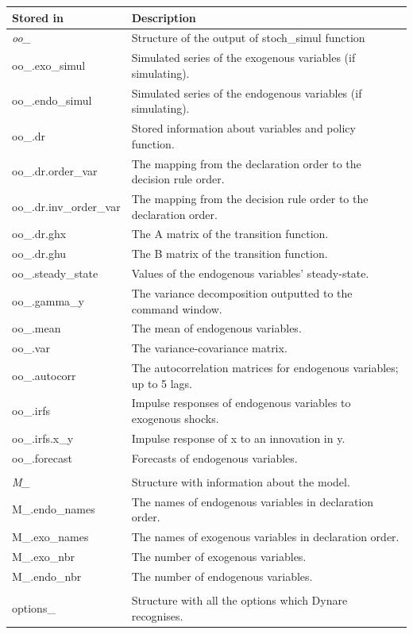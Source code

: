 \documentclass[a4paper,12pt]{article}%
\begin{document}
\begin{table}[h]
\footnotesize


\begin{center}%
\begin{tabular}
[c]{|l|l|}\hline
Stored in & Description\\\hline
\textit{oo\_} & Structure of the output of stoch\_simul function\\
oo\_.exo\_simul & Simulated series of the exogenous variables (if
simulating).\\
oo\_.endo\_simul & Simulated series of the endogenous variables (if
simulating).\\
oo\_.dr & Stored information about variables and policy function.\\
oo\_.dr.order\_var & The mapping from the declaration order to the decision
rule order.\\
oo\_.dr.inv\_order\_var & The mapping from the decision rule order to the
declaration order.\\
oo\_.dr.ghx & The A matrix of the transition function.\\
oo\_.dr.ghu & The B matrix of the transition function.\\
oo\_.steady\_state & Values of the endogenous variables' steady-state.\\
oo\_.gamma\_y & The variance decomposition outputted to the command window.\\
oo\_.mean & The mean of endogenous variables.\\
oo\_.var & The variance-covariance matrix.\\
oo\_.autocorr & The autocorrelation matrices for endogenous variables; up to 5
lags.\\
oo\_.irfs & Impulse responses of endogenous variables to exogenous shocks.\\
oo\_.irfs.x\_y & Impulse response of x to an innovation in y.\\
oo\_.forecast & Forecasts of endogenous variables.\\
& \\
\textit{M\_} & Structure with information about the model.\\
M\_.endo\_names & The names of endogenous variables in declaration order.\\
M\_.exo\_names & The names of exogenous variables in declaration order.\\
M\_.exo\_nbr & The number of exogenous variables.\\
M\_.endo\_nbr & The number of endogenous variables.\\
& \\
options\_ & Structure with all the options which Dynare recognises.\\\hline
\end{tabular}


\end{center}
\end{table}
\end{document}
